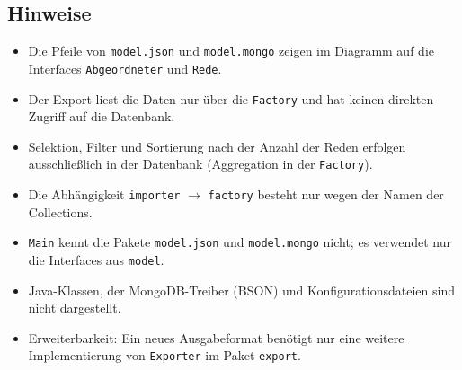 \subsection{Hinweise}
\begin{itemize}
    \item Die Pfeile von \texttt{model.json} und \texttt{model.mongo} zeigen im Diagramm auf die Interfaces \texttt{Abgeordneter} und \texttt{Rede}.
    \item Der Export liest die Daten nur über die \texttt{Factory} und hat keinen direkten Zugriff auf die Datenbank.
    \item Selektion, Filter und Sortierung nach der Anzahl der Reden erfolgen ausschließlich in der Datenbank (Aggregation in der \texttt{Factory}).
    \item Die Abhängigkeit \texttt{importer} $\rightarrow$ \texttt{factory} besteht nur wegen der Namen der Collections.
    \item \texttt{Main} kennt die Pakete \texttt{model.json} und \texttt{model.mongo} nicht; es verwendet nur die Interfaces aus \texttt{model}.
    \item Java-Klassen, der MongoDB-Treiber (BSON) und Konfigurationsdateien sind nicht dargestellt.
    \item Erweiterbarkeit: Ein neues Ausgabeformat benötigt nur eine weitere Implementierung von \texttt{Exporter} im Paket \texttt{export}.
\end{itemize}
